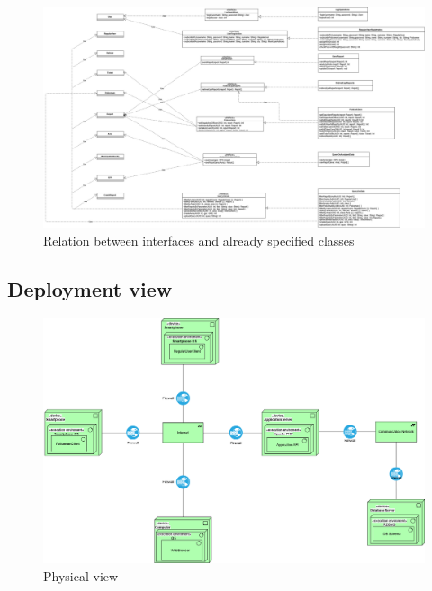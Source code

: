 \begin{figure}[h!]
	\centering
	\includegraphics[angle=90, scale=0.28]{Images/interface_diagram}
	\caption{Relation between interfaces and already specified classes}
\end{figure}
\newpage
\subsection{Deployment view}

\begin{figure}[h!]
	\centering
	\includegraphics[width=\textwidth]{Images/physical_view}
	\caption{Physical view}
\end{figure}

